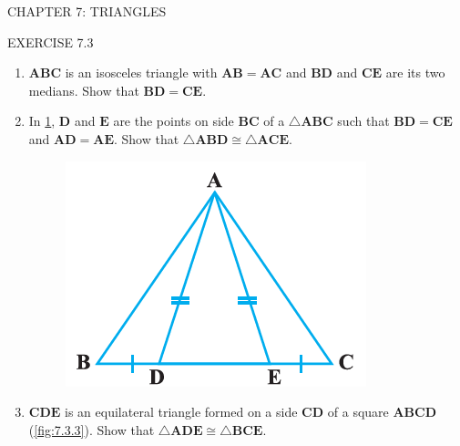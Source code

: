 \documentclass{article}
\let\vec\mathbf
\begin{document}
\begin{center}
	\color{blue} CHAPTER 7: TRIANGLES
\end{center}
\begin{center}
	\color{blue} EXERCISE 7.3
\end{center}

\begin{enumerate}
	\item $\vec{ABC}$ is an isosceles triangle with $\vec{AB=AC}$ and $\vec{BD}$ and $\vec{CE}$ are its two medians. Show that $\vec{BD=CE}$.
	\item In \ref{fig:7.3.2}, $\vec{D}$ and $\vec{E}$ are the points on side $\vec{BC}$ of a $\triangle \vec{ABC}$ such that $\vec{BD=CE}$ and $\vec{AD=AE}$. Show that $\triangle \vec{ABD} \cong \triangle \vec{ACE}$.
\begin{figure}[h]
	\centering
	\includegraphics[width=\columnwidth]{figs/Figure1.png}
	\caption{}
	\label{fig:7.3.2}
\end{figure}
\item $\vec{CDE}$ is an equilateral triangle formed on a side $\vec{CD}$ of a square $\vec{ABCD}$ (\ref{fig:7.3.3}). Show that $\triangle \vec{ADE} \cong \triangle \vec{BCE}$.
\begin{figure}[h]
	\centering

\end{figure}
\end{enumerate}
\end{document}
